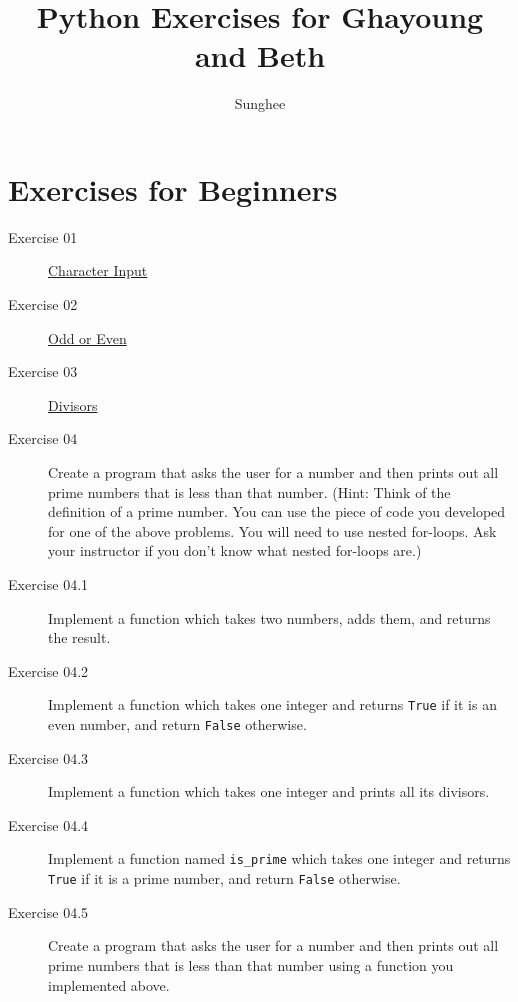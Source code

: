 \documentclass{article}
\title{Python Exercises for Ghayoung and Beth}
\author{Sunghee}
\begin{document}
\maketitle

\section{Exercises for Beginners}

\begin{description}
\item[Exercise 01]
\href{https://www.practicepython.org/exercise/2014/01/29/01-character-input.html}{Character Input}

\item[Exercise 02]
\href{https://www.practicepython.org/exercise/2014/02/05/02-odd-or-even.html}{Odd or Even}

\item[Exercise 03]
\href{https://www.practicepython.org/exercise/2014/02/26/04-divisors.html}{Divisors}

\item[Exercise 04]
Create a program that asks the user for a number and then prints out all prime numbers that is less than that number.
(Hint: Think of the definition of a prime number. You can use the piece of code you developed for one of the above problems.
You will need to use nested for-loops. Ask your instructor if you don't know what nested for-loops are.)

\item[Exercise 04.1]
Implement a function which takes two numbers, adds them, and returns the result.

\item[Exercise 04.2]
Implement a function which takes one integer and returns {\tt True} if it is an even number,
and return {\tt False} otherwise.

\item[Exercise 04.3]
Implement a function which takes one integer and prints all its divisors.

\item[Exercise 04.4]
Implement a function named \verb+is_prime+ which takes one integer and returns {\tt True} if it is a prime number,
and return {\tt False} otherwise.

\item[Exercise 04.5]
Create a program that asks the user for a number and then prints out all prime numbers that is less than that number
using a function you implemented above.


\end{description}
\end{document}

